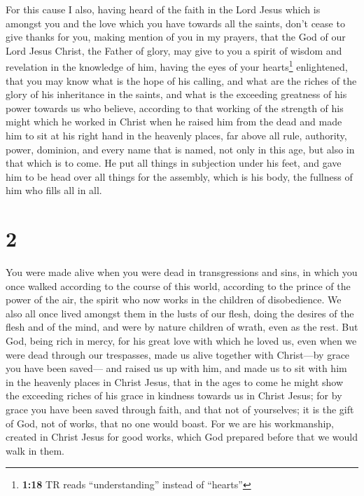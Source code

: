  For this cause I also, having heard of the faith in the
Lord Jesus which is amongst you and the love which you have towards all
the saints,  don't cease to give thanks for you, making
mention of you in my prayers,  that the God of our Lord
Jesus Christ, the Father of glory, may give to you a spirit of wisdom
and revelation in the knowledge of him,  having the eyes
of your hearts\footnote{\textbf{1:18} TR reads ``understanding'' instead
  of ``hearts''} enlightened, that you may know what is the hope of his
calling, and what are the riches of the glory of his inheritance in the
saints,  and what is the exceeding greatness of his power
towards us who believe, according to that working of the strength of his
might  which he worked in Christ when he raised him from
the dead and made him to sit at his right hand in the heavenly places,
 far above all rule, authority, power, dominion, and
every name that is named, not only in this age, but also in that which
is to come.  He put all things in subjection under his
feet, and gave him to be head over all things for the assembly,
 which is his body, the fullness of him who fills all in
all.

\hypertarget{section-1}{%
\section{2}\label{section-1}}

 You were made alive when you were dead in transgressions
and sins,  in which you once walked according to the
course of this world, according to the prince of the power of the air,
the spirit who now works in the children of disobedience. 
We also all once lived amongst them in the lusts of our flesh, doing the
desires of the flesh and of the mind, and were by nature children of
wrath, even as the rest.  But God, being rich in mercy,
for his great love with which he loved us,  even when we
were dead through our trespasses, made us alive together with
Christ---by grace you have been saved---  and raised us up
with him, and made us to sit with him in the heavenly places in Christ
Jesus,  that in the ages to come he might show the
exceeding riches of his grace in kindness towards us in Christ Jesus;
 for by grace you have been saved through faith, and that
not of yourselves; it is the gift of God,  not of works,
that no one would boast.  For we are his workmanship,
created in Christ Jesus for good works, which God prepared before that
we would walk in them.

